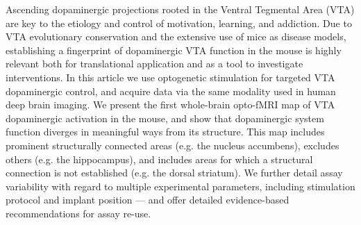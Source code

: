 Ascending dopaminergic projections rooted in the Ventral Tegmental Area (VTA) are key to the etiology and control of motivation, learning, and addiction.
Due to VTA evolutionary conservation and the extensive use of mice as disease models, establishing a fingerprint of dopaminergic VTA function in the mouse is highly relevant both for translational application and as a tool to investigate interventions.
In this article we use optogenetic stimulation for targeted VTA dopaminergic control, and acquire data via the same modality used in human deep brain imaging.
We present the first whole-brain opto-fMRI map of VTA dopaminergic activation in the mouse, and show that dopaminergic system function diverges in meaningful ways from its structure.
This map includes prominent structurally connected areas (e.g. the nucleus accumbens), excludes others (e.g. the hippocampus), and includes areas for which a structural connection is not established (e.g. the dorsal striatum).
We further detail assay variability with regard to multiple experimental parameters, including stimulation protocol and implant position --- and offer detailed evidence-based recommendations for assay re-use.
